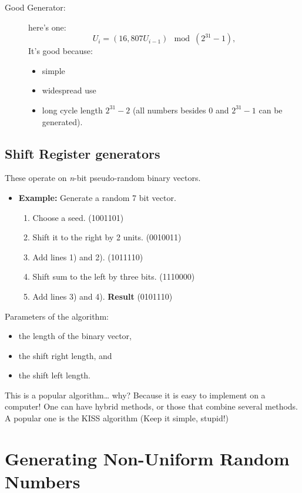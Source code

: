 \documentclass[11pt,english]{scrbook}
\begin{document}
\vspace{1in}

\begin{description}
\item[{Good Generator:}] here's one: 
\[
  U_{i}=(16,807U_{i-1})\mod(2^{31}-1),
  \]
It's good because:
\begin{itemize}
\item simple
\item widespread use
\item long cycle length \(2^{31}-2\) (all numbers besides 0 and \(2^{31}-1\) can be generated).
\end{itemize}
\end{description}

\subsection{Shift Register generators}
\label{sec:org42e9c4c}
These operate on \emph{n}-bit pseudo-random binary vectors.
\begin{itemize}
\item \textbf{Example:} Generate a random 7 bit vector.
\begin{enumerate}
\item Choose a seed. (1001101)
\item Shift it to the right by 2 units. (0010011)
\item Add lines 1) and 2). (1011110)
\item Shift sum to the left by three bits. (1110000)
\item Add lines 3) and 4). \textbf{Result} (0101110)
\end{enumerate}
\end{itemize}

Parameters of the algorithm: 
\begin{itemize}
\item the length of the binary vector,
\item the shift right length, and
\item the shift left length.
\end{itemize}

This is a popular algorithm\ldots{} why? Because it is easy to implement on a computer! One can have hybrid methods, or those that combine several methods. A popular one is the KISS algorithm (Keep it simple, stupid!)

\section{Generating Non-Uniform Random Numbers}
\label{sec:org6508559}
\end{document}
